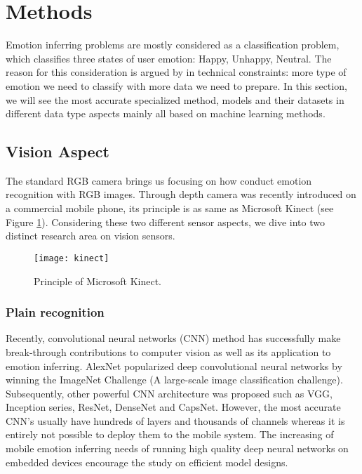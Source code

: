 \section{Methods}\label{sec:methods}

Emotion inferring problems are mostly considered as a classification problem, which classifies three states of user emotion: Happy, Unhappy, Neutral. The reason for this consideration is argued by in technical constraints: more type of emotion we need to classify with more data we need to prepare.  In this section, we will see the most accurate specialized method, models and their datasets in different data type aspects mainly all based on machine learning methods.

\subsection{Vision Aspect} \label{subsec:vision-model}

The standard RGB camera brings us focusing on how conduct emotion recognition with RGB images. Through depth camera was recently introduced on a commercial mobile phone, its principle is as same as Microsoft Kinect (see Figure \ref{fig:kinect}). Considering these two different sensor aspects, we dive into two distinct research area on vision sensors.

\begin{figure}
  \centering
  \texttt{[image: kinect]}
  \caption{Principle of Microsoft Kinect.}
  \label{fig:kinect}
\end{figure}

\subsubsection{Plain recognition}

Recently, convolutional neural networks (CNN) method has successfully make break-through contributions to computer vision as well as its application to emotion inferring. 
AlexNet \cite{Krizhevsky2012} popularized deep convolutional neural networks by winning the ImageNet Challenge (A large-scale image classification challenge). Subsequently, other powerful CNN architecture was proposed such as VGG\cite{Simonyan2015}, Inception series\cite{Szegedy2014, Szegedy2015, Szegedy2016}, ResNet\cite{He2016}, DenseNet\cite{iandola2014densenet} and CapsNet\cite{sabour2017dynamic}. However, the most accurate CNN's usually have hundreds of
layers and thousands of channels whereas it is entirely not possible to deploy them to the mobile system. The increasing of mobile emotion inferring needs of running high quality deep neural networks on embedded devices encourage the study on efficient model designs\cite{he2015convolutional}. 

